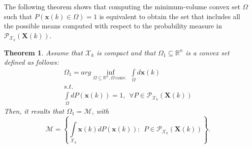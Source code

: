\documentclass[twocolumn]{autart}
\newtheorem{theorem}{Theorem}
\newcommand{\DP}[1]{{#1}}
\begin{document}
The following theorem shows that computing the minimum-volume convex set $\Omega$  such that $P(\mathbf{x}(k) \in \Omega)=1$ is
equivalent to obtain the set that includes all the possible means computed \DP{with respect to} the probability measure in $\mathcal{P}_{\mathcal{X}_k}(\mathbf{X}(k))$.
\begin{theorem} \label{Th:means}
Assume that $\mathcal{X}_k$ is compact and that $\Omega_1 \subseteq \mathbb{R}^n$ is a convex set defined as follows:
\begin{equation}
\label{eq:prob1}
 \begin{array}{l}
\Omega_1=arg\inf\limits_{\Omega \subseteq \mathbb{R}^n, \Omega~\text{conv. }} \int\limits_{\Omega} d\mathbf{x}(k) \\
s.t.\\
\int\limits_{\Omega} dP(\mathbf{x}(k))=1, \ \ \forall  P \in \mathcal{P}_{\mathcal{X}_k}(\mathbf{X}(k))
\end{array}
 \end{equation}
 Then, it results that $\Omega_1=\mathcal{M}$, with
 \begin{equation}
 \label{eq:prob2}
 \mathcal{M}=\left\{\int\limits_{\mathcal{X}_k}  \mathbf{x}(k) dP(\mathbf{x}(k))\!:\!~~P \in \mathcal{P}_{\mathcal{X}_k}(\mathbf{X}(k))\right\}.
 \end{equation}
 \end{theorem}
\end{document}
